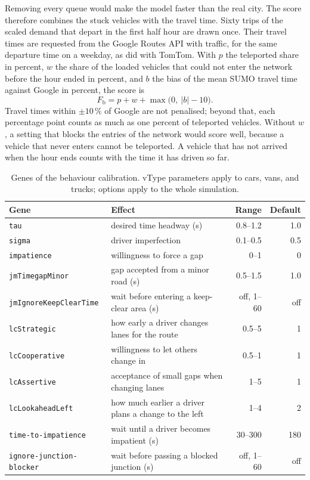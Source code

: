 Removing every queue would make the model faster than the real city.
The score therefore combines the stuck vehicles with the travel time.
Sixty trips of the scaled demand that depart in the first half hour are
drawn once. Their travel times are requested from the Google Routes API
with traffic, for the same departure time on a weekday, as
\citet{baggenstos2026} did with TomTom. With \(p\) the teleported share
in percent, \(w\) the share of the loaded vehicles that could not enter
the network before the hour ended in percent, and \(b\) the bias of the
mean SUMO travel time against Google in percent, the score is
\begin{equation}
    F_{\mathrm{b}} = p + w + \max\bigl(0,\ |b| - 10\bigr).
    \label{eq:behaviour-fitness}
\end{equation}
Travel times within \(\pm 10\,\%\) of Google are not penalised; beyond
that, each percentage point counts as much as one percent of teleported
vehicles. Without \(w\), a setting that blocks the entries of the
network would score well, because a vehicle that never enters cannot be
teleported. A vehicle that has not arrived when the hour ends counts with
the time it has driven so far.

\begin{table}[htbp]
    \centering
    \caption{Genes of the behaviour calibration. vType parameters apply
    to cars, vans, and trucks; options apply to the whole simulation.}
    \label{tab:behaviour-genes}
    \small
    \begin{tabular}{@{}lp{56mm}rr@{}}
        \toprule
        Gene & Effect & Range & Default \\
        \midrule
        \texttt{tau} & desired time headway (s) & 0.8--1.2 & 1.0 \\
        \texttt{sigma} & driver imperfection & 0.1--0.5 & 0.5 \\
        \texttt{impatience} & willingness to force a gap & 0--1 & 0 \\
        \texttt{jmTimegapMinor} & gap accepted from a minor road (s) & 0.5--1.5 & 1.0 \\
        \texttt{jmIgnoreKeepClearTime} & wait before entering a keep-clear area (s) & off, 1--60 & off \\
        \texttt{lcStrategic} & how early a driver changes lanes for the route & 0.5--5 & 1 \\
        \texttt{lcCooperative} & willingness to let others change in & 0.5--1 & 1 \\
        \texttt{lcAssertive} & acceptance of small gaps when changing lanes & 1--5 & 1 \\
        \texttt{lcLookaheadLeft} & how much earlier a driver plans a change to the left & 1--4 & 2 \\
        \texttt{time-to-impatience} & wait until a driver becomes impatient (s) & 30--300 & 180 \\
        \texttt{ignore-junction-blocker} & wait before passing a blocked junction (s) & off, 1--60 & off \\
        \bottomrule
    \end{tabular}
\end{table}

